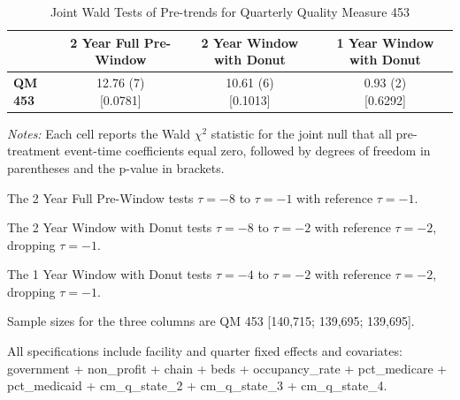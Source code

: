 \documentclass[11pt]{article}
\begin{document}
\clearpage

\begingroup
\begin{table}[!ht]
\centering
\begin{threeparttable}
\caption{Joint Wald Tests of Pre-trends for Quarterly Quality Measure 453}
\label{tab:q_pretrend_wald_453}
\small
\setlength{\tabcolsep}{8pt}

\begin{tabular}{@{}lccc@{}}
\toprule
& \textbf{2 Year Full Pre-Window} & \textbf{2 Year Window with Donut} & \textbf{1 Year Window with Donut} \\
\midrule
\textbf{QM 453} & \makecell[c]{12.76 (7) \\ {[0.0781]}} & \makecell[c]{10.61 (6) \\ {[0.1013]}} & \makecell[c]{0.93 (2) \\ {[0.6292]}} \\
\bottomrule
\end{tabular}

\begin{tablenotes}[flushleft]
\footnotesize
\item \textit{Notes:} Each cell reports the Wald $\chi^2$ statistic for the joint null that all pre-treatment event-time coefficients equal zero, followed by degrees of freedom in parentheses and the p-value in brackets.
\item The 2 Year Full Pre-Window tests $\tau=-8$ to $\tau=-1$ with reference $\tau=-1$.
\item The 2 Year Window with Donut tests $\tau=-8$ to $\tau=-2$ with reference $\tau=-2$, dropping $\tau=-1$.
\item The 1 Year Window with Donut tests $\tau=-4$ to $\tau=-2$ with reference $\tau=-2$, dropping $\tau=-1$.
\item Sample sizes for the three columns are QM 453 [140,715; 139,695; 139,695].
\item All specifications include facility and quarter fixed effects and covariates: government + non\_profit + chain + beds + occupancy\_rate + pct\_medicare + pct\_medicaid + cm\_q\_state\_2 + cm\_q\_state\_3 + cm\_q\_state\_4.
\end{tablenotes}
\end{threeparttable}
\end{table}
\endgroup
\end{document}
